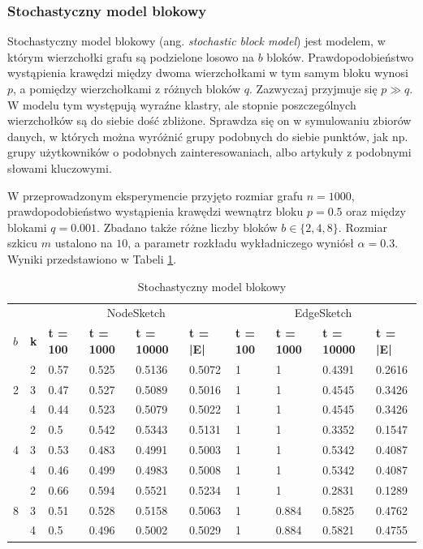     \subsubsection{Stochastyczny model blokowy}
    Stochastyczny model blokowy (ang. \textit{stochastic block model}) jest modelem, w którym wierzchołki grafu są podzielone losowo na $b$ bloków. Prawdopodobieństwo wystąpienia krawędzi między dwoma wierzchołkami w tym samym bloku wynosi $p$, a pomiędzy wierzchołkami z różnych bloków $q$. Zazwyczaj przyjmuje się $p \gg q$. W modelu tym występują wyraźne klastry, ale stopnie poszczególnych wierzchołków są do siebie dość zbliżone. Sprawdza się on w symulowaniu zbiorów danych, w których można wyróżnić grupy podobnych do siebie punktów, jak np. grupy użytkowników o podobnych zainteresowaniach, albo artykuły z podobnymi słowami kluczowymi. 

    W przeprowadzonym eksperymencie przyjęto rozmiar grafu $n = 1000$, prawdopodobieństwo wystąpienia krawędzi wewnątrz bloku $p = 0.5$ oraz między blokami $q = 0.001$. Zbadano także różne liczby bloków $b \in \{2,4,8\}$. Rozmiar szkicu $m$ ustalono na $10$, a parametr rozkładu wykładniczego wyniósł $\alpha = 0.3$. Wyniki przedstawiono w Tabeli \ref{tab:stochastic_block_model}.

    \begin{table}[!ht]
        \small
        \centering
        \begin{tabular}{|l|l|l|l|l|l|l|l|l|l|}
        \hline
            & & \multicolumn{4}{c|}{NodeSketch} & \multicolumn{4}{c|}{EdgeSketch} \\ \cline{1-10}
            \textbf{$b$} & \textbf{k} & \textbf{t = 100} & \textbf{t = 1000} & \textbf{t = 10000} & \textbf{t = |E|} & \textbf{t = 100} & \textbf{t = 1000} & \textbf{t = 10000} & \textbf{t = |E|} \\ \hline\hline
            \multirow{3}{*}{2} & 2 & 0.57 & 0.525 & 0.5136 & 0.5072 & 1 & 1 & 0.4391 & 0.2616 \\ \cline{2-10}
             & 3 & 0.47 & 0.527 & 0.5089 & 0.5016 & 1 & 1 & 0.4545 & 0.3426 \\ \cline{2-10}
             & 4 & 0.44 & 0.523 & 0.5079 & 0.5022 & 1 & 1 & 0.4545 & 0.3426 \\ \hline\hline
            \multirow{3}{*}{4} & 2 & 0.5 & 0.542 & 0.5343 & 0.5131 & 1 & 1 & 0.3352 & 0.1547 \\ \cline{2-10}
             & 3 & 0.53 & 0.483 & 0.4991 & 0.5003 & 1 & 1 & 0.5342 & 0.4087 \\ \cline{2-10}
             & 4 & 0.46 & 0.499 & 0.4983 & 0.5008 & 1 & 1 & 0.5342 & 0.4087 \\ \hline\hline
            \multirow{3}{*}{8} & 2 & 0.66 & 0.594 & 0.5521 & 0.5234 & 1 & 1 & 0.2831 & 0.1289 \\ \cline{2-10}
             & 3 & 0.51 & 0.528 & 0.5158 & 0.5063 & 1 & 0.884 & 0.5825 & 0.4762 \\ \cline{2-10}
             & 4 & 0.5 & 0.496 & 0.5002 & 0.5029 & 1 & 0.884 & 0.5821 & 0.4755 \\ \hline
        \end{tabular}
        \caption{Stochastyczny model blokowy}
        \label{tab:stochastic_block_model}
    \end{table}

